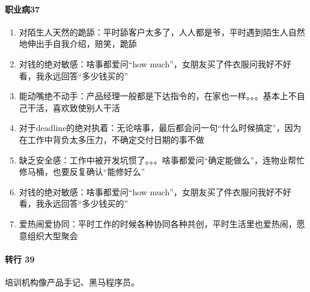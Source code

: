 \documentclass[letterpaper,10pt,english]{sphinxmanual}
\begin{document}
\paragraph{职业病37\sphinxfootnotemark[208]}
\label{\detokenize{chapter_introduction/PM:id60}}%
\begin{footnotetext}[208]\sphinxAtStartFootnote
{}
%
\end{footnotetext}\ignorespaces \begin{enumerate}
%
\item {} 
对陌生人天然的跪舔：平时舔客户太多了，人人都是爷，平时遇到陌生人自然地伸出手自我介绍，赔笑，跪舔

\item {} 
对钱的绝对敏感：啥事都爱问“how
much”，女朋友买了件衣服问我好不好看，我永远回答“多少钱买的”

\item {} 
能动嘴绝不动手：产品经理一般都是下达指令的，在家也一样。。。基本上不自己干活，喜欢致使别人干活

\item {} 
对于deadline的绝对执着：无论啥事，最后都会问一句“什么时候搞定”，因为在工作中背负太多压力，不确定交付日期的事不做

\item {} 
缺乏安全感：工作中被开发坑惯了。。。啥事都爱问“确定能做么”，连物业帮忙修马桶，也要反复确认“能修好么”

\item {} 
对钱的绝对敏感：啥事都爱问“how
much”，女朋友买了件衣服问我好不好看，我永远回答“多少钱买的”

\item {} 
爱热闹爱协同：平时工作的时候各种协同各种共创，平时生活里也爱热闹，愿意组织大型聚会

\end{enumerate}


\paragraph{转行 39\sphinxfootnotemark[209]}
\label{\detokenize{chapter_introduction/PM:id61}}%
\begin{footnotetext}[209]\sphinxAtStartFootnote
{}
%
\end{footnotetext}\ignorespaces 
培训机构像产品手记、黑马程序员。%
\begin{footnote}[210]\sphinxAtStartFootnote
{}
%
\end{footnote}
\end{document}
